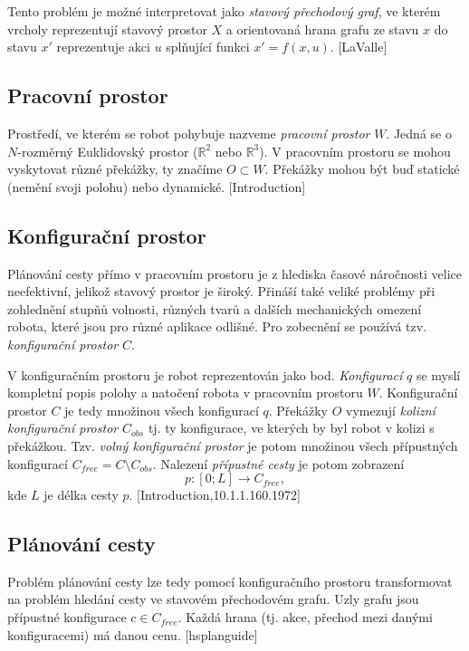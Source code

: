 Tento problém je možné interpretovat jako \emph{stavový přechodový graf}, ve kterém vrcholy reprezentují stavový prostor $X$ a orientovaná hrana grafu ze stavu $x$ do stavu $x'$ reprezentuje akci $u$ splňující funkci $x'=f(x,u)$. [LaValle]

\subsection{Pracovní prostor}
Prostředí, ve kterém se robot pohybuje nazveme \emph{pracovní prostor} $W$. Jedná se o $N$-rozměrný Euklidovský prostor ($\mathbb{R}^2$ nebo $\mathbb{R}^3$). V pracovním prostoru se mohou vyskytovat různé překážky, ty značíme $O\subset W$. Překážky mohou být buď statické (nemění svoji polohu) nebo dynamické. [Introduction]


\subsection{Konfigurační prostor}
Plánování cesty přímo v pracovním prostoru je z hlediska časové náročnosti velice neefektivní, jelikož stavový prostor je široký. Přináší také veliké problémy při zohlednění stupňů volnosti, různých tvarů a dalších mechanických omezení robota, které jsou pro různé aplikace odlišné. Pro zobecnění se používá tzv. \emph{konfigurační prostor} $C$.

V konfiguračním prostoru je robot reprezentován jako bod. \emph{Konfigurací} $q$ se myslí kompletní popis polohy a natočení robota v pracovním prostoru $W$. Konfigurační prostor $C$ je tedy množinou všech konfigurací $q$. Překážky $O$ vymezují \emph{kolizní konfigurační prostor} $C_{obs}$ tj. ty konfigurace, ve kterých by byl robot v kolizi s překážkou. Tzv. \emph{volný konfigurační prostor} je potom množinou všech přípustných konfigurací $C_{free}=C \setminus C_{obs}$. Nalezení \emph{přípustné cesty} je potom zobrazení
\begin{equation}
p: \left[0;L\right]\to C_{free},
\end{equation}
kde $L$ je délka cesty $p$. [Introduction,10.1.1.160.1972]

\subsection{Plánování cesty}

Problém plánování cesty lze tedy pomocí konfiguračního prostoru transformovat na problém hledání cesty ve stavovém přechodovém grafu. Uzly grafu jsou přípustné konfigurace $c\in C_{free}$. Každá hrana (tj. akce, přechod mezi danými konfiguracemi) má danou cenu. [hsplanguide]

